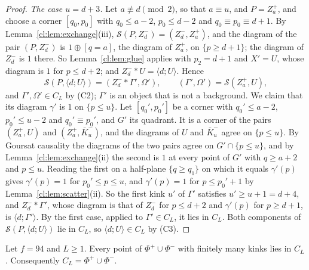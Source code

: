 \begin{proof}
\emph{The case $u=d+3$.} Let $a\not\equiv d\pmod2$, so that $a\equiv u$, and $P=Z^+_a$, and choose a corner $[q_0,p_0]$ with $q_0\le a-2$, $p_0\le d-2$ and $q_0\equiv p_0\equiv d+1$. By Lemma~\ref{cl:lem:exchange}(iii), $\mathcal S(P,Z^-_d)=(Z^-_d,Z^+_a)$, and the diagram of the pair $(P,Z^-_d)$ is $1\oplus[q=a]$, the diagram of $Z^+_a$, on $\{p\ge d+1\}$; the diagram of $Z^-_d$ is $1$ there. So Lemma~\ref{cl:lem:glue} applies with $p_2=d+1$ and $X'=U$, whose diagram is $1$ for $p\le d+2$; and $Z^-_d*U=\langle d;U\rangle$. Hence
\[
\mathcal S(P,\langle d;U\rangle)=(Z^-_d*\Gamma',\Omega'),\qquad(\Gamma',\Omega')=\mathcal S(Z^+_a,U),
\]
and $\Gamma',\Omega'\in C_L$ by (C2); $\Gamma'$ is an object that is not a background. We claim that its diagram $\gamma'$ is $1$ on $\{p\le u\}$. Let $[q_0',p_0']$ be a corner with $q_0'\le a-2$, $p_0'\le u-2$ and $q_0'\equiv p_0'$, and $G'$ its quadrant. It is a corner of the pairs $(Z^+_a,U)$ and $(Z^+_a,\bar K^-_u)$, and the diagrams of $U$ and $\bar K^-_u$ agree on $\{p\le u\}$. By Goursat causality the diagrams of the two pairs agree on $G'\cap\{p\le u\}$, and by Lemma~\ref{cl:lem:exchange}(ii) the second is $1$ at every point of $G'$ with $q\ge a+2$ and $p\le u$. Reading the first on a half-plane $\{q\ge q_1\}$ on which it equals $\gamma'(p)$ gives $\gamma'(p)=1$ for $p_0'\le p\le u$, and $\gamma'(p)=1$ for $p\le p_0'+1$ by Lemma~\ref{cl:lem:scatter}(ii). So the first kink $u'$ of $\Gamma'$ satisfies $u'\ge u+1=d+4$, and $Z^-_d*\Gamma'$, whose diagram is that of $Z^-_d$ for $p\le d+2$ and $\gamma'(p)$ for $p\ge d+1$, is $\langle d;\Gamma'\rangle$. By the first case, applied to $\Gamma'\in C_L$, it lies in $C_L$. Both components of $\mathcal S(P,\langle d;U\rangle)$ lie in $C_L$, so $\langle d;U\rangle\in C_L$ by (C3).
\end{proof}

\begin{theorem}\label{cl:thm:objects}
Let $f=94$ and $L\ge1$. Every point of $\Phi^+\cup\Phi^-$ with finitely many kinks lies in $C_L$. Consequently $C_L=\Phi^+\cup\Phi^-$.
\end{theorem}

